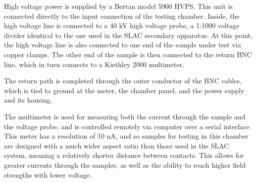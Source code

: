 \documentclass[a4paper,12pt]{article}
\begin{document}
High voltage power is supplied by a Bertan model 5900 HVPS.  This unit is connected directly to the input connection of the testing chamber.  Inside, the high voltage line is connected to a 40 kV high voltage probe, a 1:1000 voltage divider identical to the one used in the SLAC secondary apparatus.  At this point, the high voltage line is also connected to one end of the sample under test via copper clamps.  The other end of the sample is then connected to the return BNC line, which in turn connects to a Kiethley 2000 multimeter.

The return path is completed through the outer conductor of the BNC cables, which is tied to ground at the meter, the chamber panel, and the power supply and its housing.

The multimeter is used for measuring both the current through the sample and the voltage probe, and is controlled remotely via computer over a serial interface.  This meter has a resolution of 10 nA, and so samples for testing in this chamber are designed with a much wider aspect ratio than those used in the SLAC system, meaning a relatively shorter distance between contacts.  This allows for greater currents through the samples, as well as the ability to reach higher field strengths with lower voltage.
\end{document}
